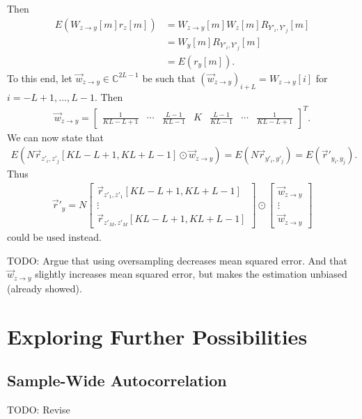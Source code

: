 \documentclass[a4paper, openany, oneside]{memoir}
\begin{document}
Then
\begin{align*}
    E(W_{z \to y}[m]r_z[m]) &= W_{z \to y}[m] W_z[m] R_{Y'_i,Y'_j}[m] \\
    &= W_y[m] R_{Y'_i,Y'_j}[m] \\
    &= E(r_y[m]).
\end{align*}
To this end, let $\vec{w}_{z \to y} \in \mathbb{C}^{2L-1}$ be such that $(\vec{w}_{z \to y})_{i+L} = W_{z \to y}[i]$ for $i = -L+1,\ldots,L-1$. Then
\begin{align*}
    \vec{w}_{z \to y} =\begin{bmatrix}
        \frac{1}{KL - L + 1} & \cdots & \frac{L- 1}{KL - 1} & K & \frac{L- 1}{KL - 1} & \cdots & \frac{1}{KL - L + 1}
    \end{bmatrix}^T.
\end{align*} 
We can now state that
\begin{align*}
    E(N \vec{r}_{z'_i,z'_j}[KL-L+1,KL+L-1] \odot \vec{w}_{z \to y}) = E(N \vec{r}_{y'_i,y'_j}) = E(\vec{r}'_{y_i,y_j}).
\end{align*}
Thus
\begin{align*}
    \vec{r}'_y = N\begin{bmatrix}
        \vec{r}_{z'_1,z'_1}[KL-L+1,KL+L-1] \\
        \vdots \\
        \vec{r}_{z'_M,z'_M}[KL-L+1,KL+L-1]
    \end{bmatrix} \odot \begin{bmatrix}
        \vec{w}_{z \to y} \\
        \vdots \\
        \vec{w}_{z \to y} 
    \end{bmatrix}
\end{align*}
could be used instead.

TODO: Argue that using oversampling decreases mean squared error. And that $\vec{w}_{z\to y}$ slightly increases mean squared error, but makes the estimation unbiased (already showed).
\section{Exploring Further Possibilities}
\subsection{Sample-Wide Autocorrelation}
TODO: Revise
\end{document}
